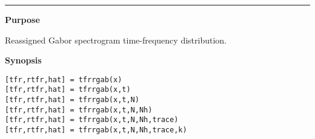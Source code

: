 

\hspace*{-1.6cm}{\Large \bf tfrrgab}

\vspace*{-.4cm}
\hspace*{-1.6cm}\rule[0in]{16.5cm}{.02cm}
\vspace*{.2cm}

{\bf \large {}\selectfont Purpose}\\
\hspace*{1.5cm}
\begin{minipage}[t]{13.5cm}
Reassigned Gabor spectrogram time-frequency distribution.
\end{minipage}
\vspace*{.5cm}

{\bf \large {}\selectfont Synopsis}\\
\hspace*{1.5cm}
\begin{minipage}[t]{13.5cm}
\begin{verbatim}
[tfr,rtfr,hat] = tfrrgab(x) 
[tfr,rtfr,hat] = tfrrgab(x,t) 
[tfr,rtfr,hat] = tfrrgab(x,t,N) 
[tfr,rtfr,hat] = tfrrgab(x,t,N,Nh) 
[tfr,rtfr,hat] = tfrrgab(x,t,N,Nh,trace) 
[tfr,rtfr,hat] = tfrrgab(x,t,N,Nh,trace,k) 
\end{verbatim}
\end{minipage}
\vspace*{.5cm}

